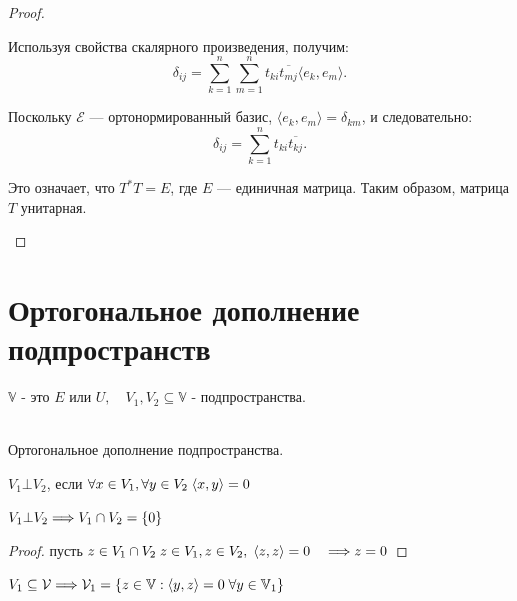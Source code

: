 \begin{proof}
\begin{enumerate}
        \quad Используя свойства скалярного произведения, получим:
        \[
        \delta_{ij} = \sum_{k=1}^n \sum_{m=1}^n t_{ki} \overline{t_{mj}} \langle e_k, e_m \rangle.
        \]
        \nl
        
        \quad Поскольку \( \mathcal{E} \) — ортонормированный базис, \( \langle e_k, e_m \rangle = \delta_{km} \), и следовательно:
        \[
        \delta_{ij} = \sum_{k=1}^n t_{ki} \overline{t_{kj}}.
        \]
        \nl
        
        \quad Это означает, что \( T^* T = E \), где \( E \) — единичная матрица. Таким образом, матрица \( T \) унитарная.
    \end{enumerate}
\end{proof}


\section{Ортогональное дополнение подпространств}

$\mathbb{V}$ - это $E$ или $U, \quad V_{1}, V_{2} \subseteq \mathbb{V}$ - подпространства.
        
\begin{shdef}
    \begin{definition}
    \leavevmode \\

        Ортогональное дополнение подпространства. 
        
        $V_{1} \bot V_{2}$, если $\forall x \in V_{1}, \forall y \in V_{2} \; \langle x, y \rangle = 0$
    \end{definition}
\end{shdef}

\begin{shth}
    \begin{theorem}
        $V_{1} \bot V_{2} \Longrightarrow V_{1} \cap V_{2} = \{0\}$
    \end{theorem}
\end{shth}

\begin{proof}
    \leavevmode \nl
    
    пусть $z \in V_{1} \cap V_{2} \; z \in V_{1}, z \in V_{2}, \; \langle z, z \rangle = 0 \quad \Longrightarrow z = 0$
\end{proof}

\begin{shdef}
    \begin{definition}
        $V_{1} \subseteq \mathcal{V} \Longrightarrow \mathcal{V}_{1} = \{ z \in \mathbb{V}: \langle y, z \rangle = 0 \; \forall y \in \mathbb{V}_{1} \}$
    \end{definition}
\end{shdef}

